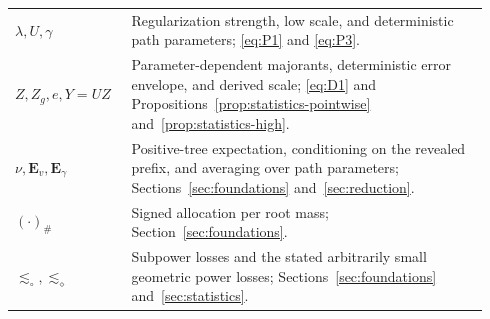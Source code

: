 \begin{longtable}{@{}p{0.23\linewidth}p{0.71\linewidth}@{}}
\(\lambda,U,\gamma\)
 & Regularization strength, low scale, and deterministic path parameters;
 \eqref{eq:P1} and \eqref{eq:P3}. \\
\(Z,Z_g,e,Y=UZ\)
 & Parameter-dependent majorants, deterministic error envelope, and
 derived scale; \eqref{eq:D1} and Propositions~\ref{prop:statistics-pointwise}
 and~\ref{prop:statistics-high}. \\
\(\nu,\mathbf E_v,\mathbf E_\gamma\)
 & Positive-tree expectation, conditioning on the revealed prefix, and
 averaging over path parameters; Sections~\ref{sec:foundations}
 and~\ref{sec:reduction}. \\
\((\cdot)_\#\)
 & Signed allocation per root mass; Section~\ref{sec:foundations}. \\
\(\lesssim_\circ,\lesssim_\diamond\)
 & Subpower losses and the stated arbitrarily small geometric power
 losses; Sections~\ref{sec:foundations} and~\ref{sec:statistics}. \\
\bottomrule
\end{longtable}
\endgroup
